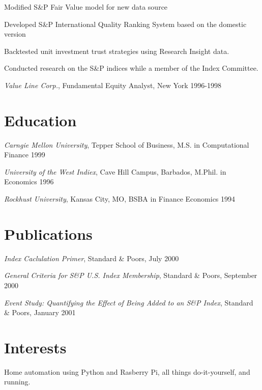 \documentclass[11pt,]{article}
\renewenvironment{itemize}{
  \begin{list}{}{
    \setlength{\leftmargin}{1.5em}
  }
}{
  \end{list}
}
\begin{document}
\begin{itemize}
\item
  Modified S\&P Fair Value model for new data source
\item
  Developed S\&P International Quality Ranking System based on the
  domestic version
\item
  Backtested unit investment trust strategies using Research Insight
  data.
\item
  Conducted research on the S\&P indices while a member of the Index
  Committee.
\end{itemize}

\emph{Value Line Corp.}, Fundamental Equity Analyst, New York
\hfill 1996-1998

\hypertarget{education}{%
\section{Education}\label{education}}

\emph{Carngie Mellon University}, Tepper School of Business, M.S. in
Computational Finance \hfill 1999

\emph{University of the West Indiex}, Cave Hill Campus, Barbados,
M.Phil. in Economics \hfill 1996

\emph{Rockhust University}, Kansas City, MO, BSBA in Finance Economics
\hfill 1994

\hypertarget{publications}{%
\section{Publications}\label{publications}}

\emph{Index Caclulation Primer}, Standard \& Poors, July 2000

\emph{General Criteria for S\&P U.S. Index Membership}, Standard \&
Poors, September 2000

\emph{Event Study: Quantifying the Effect of Being Added to an S\&P
Index}, Standard \& Poors, January 2001

\hypertarget{interests}{%
\section{Interests}\label{interests}}

Home automation using Python and Rasberry Pi, all things do-it-yourself,
and running.
\end{document}
